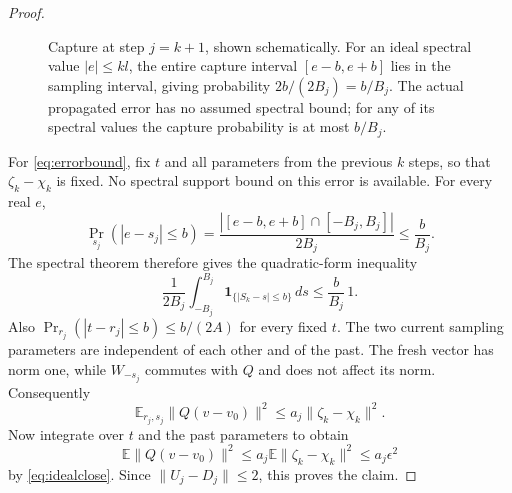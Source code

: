 \documentclass[11pt]{article}
\theoremstyle{definition}
\newcommand{\E}{\mathbb E}
\newcommand{\one}{\mathbf1}
\begin{document}
\begin{proof}
\begin{figure}[tbp]
\centering
{}
\caption{Capture at step $j=k+1$, shown schematically.
For an ideal spectral value $|e|\le kl$, the entire capture interval
$[e-b,e+b]$ lies in the sampling interval, giving probability
$2b/(2B_j)=b/B_j$. The actual propagated error has no assumed spectral
bound; for any of its spectral values the capture probability is at most
$b/B_j$.}
\label{fig:capture}
\end{figure}

For \eqref{eq:errorbound}, fix $t$ and all parameters from the previous
$k$ steps, so that $\zeta_k-\chi_k$ is fixed. No spectral support bound
on this error is available. For every real $e$,
\[
 \Pr_{s_j}(|e-s_j|\le b)
 =\frac{|[e-b,e+b]\cap[-B_j,B_j]|}{2B_j}\le\frac b{B_j}.
\]
The spectral theorem therefore gives the quadratic-form inequality
\[
 \frac1{2B_j}\int_{-B_j}^{B_j}
       \one_{\{|S_k-s|\le b\}}\,ds\le\frac b{B_j}\,1.
\]
Also $\Pr_{r_j}(|t-r_j|\le b)\le b/(2A)$ for every fixed $t$.
The two current sampling parameters are independent of each other and
of the past. The fresh vector has norm one, while $W_{-s_j}$ commutes
with $Q$ and does not affect its norm. Consequently
\[
 \E_{r_j,s_j}\|Q(v-v_0)\|^2
 \le a_j\|\zeta_k-\chi_k\|^2.
\]
Now integrate over $t$ and the past parameters to obtain
\[
 \E\|Q(v-v_0)\|^2\le a_j\E\|\zeta_k-\chi_k\|^2\le a_j\epsilon^2
\]
by \eqref{eq:idealclose}. Since $\|U_j-D_j\|\le2$, this proves the claim.


\end{proof}
\end{document}
